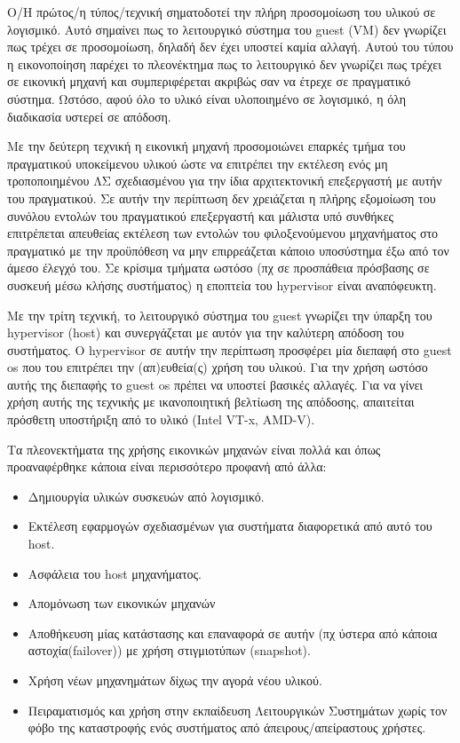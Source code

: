 Ο/Η πρώτος/η τύπος/τεχνική σηματοδοτεί την πλήρη προσομοίωση του υλικού σε
λογισμικό. Αυτό σημαίνει πως το λειτουργικό σύστημα του guest (VM) δεν γνωρίζει
πως τρέχει σε προσομοίωση, δηλαδή δεν έχει υποστεί καμία αλλαγή. Αυτού του τύπου
η εικονοποίηση παρέχει το πλεονέκτημα πως το λειτουργικό δεν γνωρίζει πως τρέχει
σε εικονική μηχανή και συμπεριφέρεται ακριβώς σαν να έτρεχε σε πραγματικό
σύστημα. Ωστόσο, αφού όλο το υλικό είναι υλοποιημένο σε λογισμικό, η όλη
διαδικασία υστερεί σε απόδοση.

Με την δεύτερη τεχνική η εικονική μηχανή προσομοιώνει επαρκές τμήμα του
πραγματικού υποκείμενου υλικού ώστε να επιτρέπει την εκτέλεση ενός μη
τροποποιημένου ΛΣ σχεδιασμένου για την ίδια αρχιτεκτονική επεξεργαστή με αυτήν
του πραγματικού. Σε αυτήν την περίπτωση δεν χρειάζεται η πλήρης εξομοίωση του
συνόλου εντολών του πραγματικού επεξεργαστή και μάλιστα υπό συνθήκες επιτρέπεται
απευθείας εκτέλεση των εντολών του φιλοξενούμενου μηχανήματος στο πραγματικό με
την προϋπόθεση να μην επιρρεάζεται κάποιο υποσύστημα έξω από τον άμεσο έλεγχό
του. Σε κρίσιμα τμήματα ωστόσο (πχ σε προσπάθεια πρόσβασης σε συσκευή μέσω κλήσης
συστήματος) η εποπτεία του hypervisor είναι αναπόφευκτη.

Με την τρίτη τεχνική, το λειτουργικό σύστημα του guest γνωρίζει την ύπαρξη του
hypervisor (host) και συνεργάζεται με αυτόν για την καλύτερη απόδοση του
συστήματος. Ο hypervisor σε αυτήν την περίπτωση προσφέρει μία διεπαφή στο guest
os που του επιτρέπει την (απ)ευθεία(ς) χρήση του υλικού. Για την χρήση ωστόσο
αυτής της διεπαφής το guest os πρέπει να υποστεί βασικές αλλαγές. Για να γίνει
χρήση αυτής της τεχνικής με ικανοποιητική βελτίωση της απόδοσης, απαιτείται
πρόσθετη υποστήριξη από το υλικό (Intel VT-x, AMD-V).

Τα πλεονεκτήματα της χρήσης εικονικών μηχανών είναι πολλά και όπως προαναφέρθηκε
κάποια είναι περισσότερο προφανή από άλλα:
\begin{itemize}
	\item Δημιουργία υλικών συσκευών από λογισμικό.
	\item Εκτέλεση εφαρμογών σχεδιασμένων για συστήματα διαφορετικά από αυτό
		του host.
	\item Ασφάλεια του host μηχανήματος.
	\item Απομόνωση των εικονικών μηχανών
	\item Αποθήκευση μίας κατάστασης και επαναφορά σε αυτήν (πχ ύστερα από
		κάποια αστοχία(failover)) με χρήση στιγμιοτύπων (snapshot).
	\item Χρήση νέων μηχανημάτων δίχως την αγορά νέου υλικού.
	\item Πειραματισμός και χρήση στην εκπαίδευση Λειτουργικών Συστημάτων
		χωρίς τον φόβο της καταστροφής ενός συστήματος από
		άπειρους/απείραστους χρήστες.
\end{itemize}






